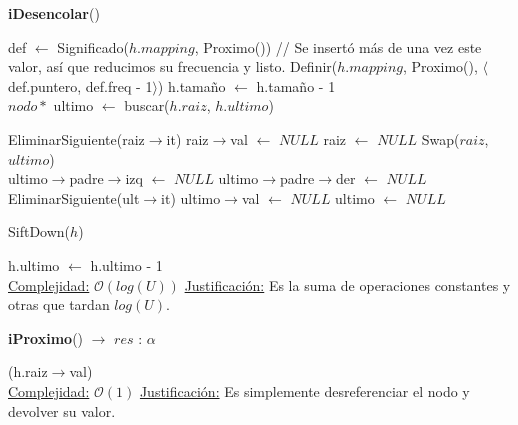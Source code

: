 \begin{Algoritmos}
    \begin{algorithm}
    \caption{\textbf{iDesencolar}()}
    \begin{algorithmic}
        \State def $\gets$ Significado($h.mapping$, Proximo())  
          
            \State // Se insertó más de una vez este valor, así que reducimos su frecuencia y listo.
            \State Definir($h.mapping$, Proximo(), $\langle$def.puntero, def.freq - 1$\rangle$)  
            \State h.tamaño $\gets$ h.tamaño - 1  
            \State \Return
        \EndIf
        \\
        \State $nodo*$ ultimo $\gets$ buscar($h.raiz$, $h.ultimo$)

            \State EliminarSiguiente(raiz$\to$it)  
            \State raiz$\to$val $\gets$ $NULL$  
            \State raiz $\gets$ $NULL$  
        \Else
            \State Swap($raiz$, $ultimo$)  
            \\
              
                \State ultimo$\to$padre$\to$izq $\gets$ $NULL$  
            \Else
                \State ultimo$\to$padre$\to$der $\gets$ $NULL$  
            \EndIf
            \State EliminarSiguiente(ult$\to$it)
            \State ultimo$\to$val $\gets$ $NULL$  
            \State ultimo $\gets$ $NULL$  

            \State SiftDown($h$)  
        \EndIf

        \State h.ultimo $\gets$ h.ultimo - 1  
        \\
        \Statex \underline{Complejidad:} $\mathcal{O}(log(U))$
        \Statex \underline{Justificación:} Es la suma de operaciones constantes y otras que tardan $log(U)$.
    \end{algorithmic}
    \end{algorithm}

    \begin{algorithm}
    \caption{\textbf{iProximo}() $\to$ $res$ : $\alpha$}
    \begin{algorithmic}
        \State \Return *(h.raiz$\to$val)
        \\
        \Statex \underline{Complejidad:} $\mathcal{O}(1)$
        \Statex \underline{Justificación:} Es simplemente desreferenciar el nodo y devolver su valor.
    \end{algorithmic}
    \end{algorithm}


\end{Algoritmos}
